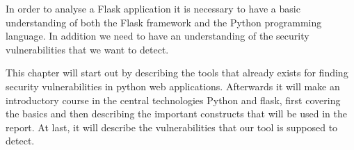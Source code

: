 In order to analyse a Flask application it is necessary to have a basic understanding of both the Flask framework and the Python programming language.
In addition we need to have an understanding of the security vulnerabilities that we want to detect.

This chapter will start out by describing the tools that already exists for finding security vulnerabilities in python web applications.
Afterwards it will make an introductory course in the central technologies Python and flask, first covering the basics and then describing the important constructs that will be used in the report.
At last, it will describe the vulnerabilities that our tool is supposed to detect.
